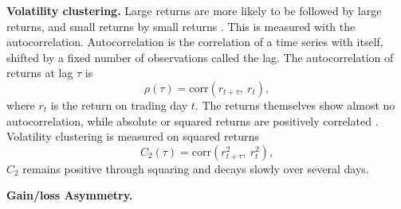 \textbf{Volatility clustering.} Large returns are more likely to be followed by large returns, and small returns by small returns  \parencite{contEmpiricalPropertiesAsset2001}. This is measured with the autocorrelation. Autocorrelation is the correlation of a time series with itself, shifted by a fixed number
of observations called the lag. The autocorrelation of returns at lag $\tau$ is 
\begin{equation}
    \rho(\tau) = \mathrm{corr}\!\left( r_{t+\tau},\ r_{t} \right),
    \label{eq:autocorrelation}
\end{equation}
where $r_t$ is the return on trading day $t$. The returns themselves show almost no autocorrelation, while absolute or squared returns are positively correlated \parencite{contEmpiricalPropertiesAsset2001}. Volatility clustering is measured on squared returns
\begin{equation}
    C_2(\tau) = \mathrm{corr}\!\left( r_{t+\tau}^{2},\ r_{t}^{2} \right),
    \label{eq:vol-clustering}
\end{equation}
$C_2$ remains positive through squaring and decays slowly over several days.

\textbf{Gain/loss Asymmetry.}

